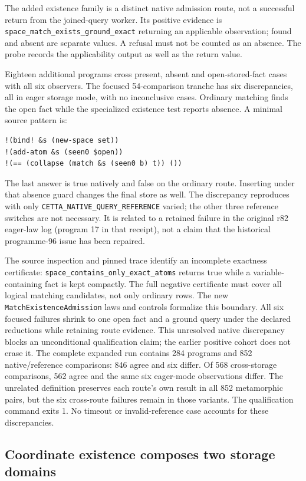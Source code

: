 \documentclass[11pt,a4paper]{article}
\newcommand{\code}[1]{\nolinkurl{#1}}
\begin{document}
The added existence family is a distinct native admission route, not a
successful return from the joined-query worker. Its positive evidence is
\code{space_match_exists_ground_exact} returning an applicable observation;
found and absent are separate values. A refusal must not be counted as an
absence. The probe records the applicability output as well as the return
value.

Eighteen additional programs cross present, absent and open-stored-fact
cases with all six observers. The focused 54-comparison tranche has six
discrepancies, all in eager storage mode, with no inconclusive cases. Ordinary
matching finds the open fact while the specialized existence test reports
absence. A minimal source pattern is:
\begin{verbatim}
!(bind! &s (new-space set))
!(add-atom &s (seen0 $open))
!(== (collapse (match &s (seen0 b) t)) ())
\end{verbatim}
The last answer is true natively and false on the ordinary route. Inserting
under that absence guard changes the final store as well. The discrepancy
reproduces with only \code{CETTA_NATIVE_QUERY_REFERENCE} varied; the other
three reference switches are not necessary. It is related to a retained
failure in the original r82 eager-law log (program 17 in that receipt), not
a claim that the historical programme-96 issue has been repaired.

The source inspection and pinned trace identify an incomplete exactness
certificate: \code{space_contains_only_exact_atoms} returns true while a
variable-containing fact is kept compactly. The full negative certificate
must cover all logical matching candidates, not only ordinary rows. The
new \code{MatchExistenceAdmission} laws and controls formalize this boundary.
All six focused failures shrink to one open fact and a ground query under
the declared reductions while retaining route evidence. This unresolved
native discrepancy blocks an unconditional qualification claim; the
earlier positive cohort does not erase it.
The complete expanded run contains 284 programs and 852 native/reference
comparisons: 846 agree and six differ. Of 568 cross-storage comparisons,
562 agree and the same six eager-mode observations differ. The unrelated
definition preserves each route's own result in all 852 metamorphic pairs,
but the six cross-route failures remain in those variants. The qualification
command exits 1. No timeout or invalid-reference case accounts for these
discrepancies.

\subsection{Coordinate existence composes two storage domains}
\end{document}
